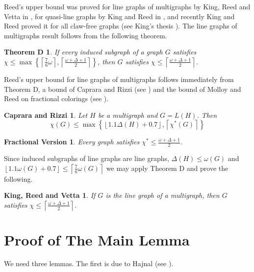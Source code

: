 \documentclass[12pt]{article}
\theoremstyle{plain}
\newtheorem*{CapRizz}{Caprara and Rizzi}
\newtheorem*{FractionalTheorem}{Fractional Version}
\newtheorem*{KingVettaReed}{King, Reed and Vetta}
\newtheorem*{TheoremD}{Theorem D}
\theoremstyle{definition}
\theoremstyle{remark}
\begin{document}
Reed's upper bound was proved for line graphs of multigraphs by King, Reed and Vetta in \cite{LineGraphs}, for quasi-line graphs by King and Reed in \cite{QuasiLineGraphs}, and recently King and Reed proved it for all claw-free graphs (see King's thesis \cite{KingThesis}).  The line graphs of multigraphs result follows from the following theorem.\newline

\begin{TheoremD}
If every induced subgraph of a graph $G$ satisfies $\chi \leq \max\left\{\left\lceil \frac{7}{6}\omega \right\rceil, \left\lceil \frac{\omega + \Delta + 1}{2}\right\rceil\right\}$, then $G$ satisfies $\chi \leq \left\lceil \frac{\omega + \Delta + 1}{2}\right\rceil$.
\end{TheoremD}

Reed's upper bound for line graphs of multigraphs follows immediately from Theorem D, a bound of Caprara and Rizzi (see \cite{CapraraAndRizzi}) and the bound of Molloy and Reed on fractional colorings (see \cite{MolloyAndReed}).

\begin{CapRizz}
Let $H$ be a multigraph and $G = L(H)$.  Then
\[\chi(G) \leq \max\left\{\left\lfloor 1.1\Delta(H) + 0.7 \right\rfloor, \left\lceil \chi^*(G) \right\rceil\right\}\]
\end{CapRizz}

\begin{FractionalTheorem}
Every graph satisfies $\chi^* \leq \frac{\omega + \Delta + 1}{2}$.
\end{FractionalTheorem}

Since induced subgraphs of line graphs are line graphs, $\Delta(H) \leq \omega(G)$ and $\left\lfloor 1.1 \omega(G) + 0.7 \right\rfloor \leq \left\lceil \frac{7}{6}\omega(G) \right\rceil$ we may apply Theorem D and prove the following.

\begin{KingVettaReed}
If $G$ is the line graph of a multigraph, then $G$ satisfies $\chi \leq \left\lceil \frac{\omega + \Delta + 1}{2}\right\rceil$.
\end{KingVettaReed}

\section{Proof of The Main Lemma}
We need three lemmas.  The first is due to Hajnal (see \cite{Hajnal}).
\end{document}
